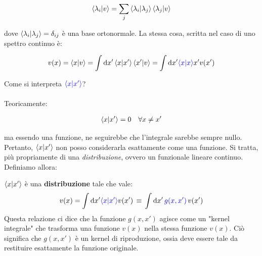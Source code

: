 \begin{align*}
	\braket{\lambda_i}{v} = \sum_j \braket{\lambda_i}{\lambda_j} \braket{\lambda_j}{v}
\end{align*}

	dove $\braket{\lambda_i}{\lambda_j} = \delta_{ij}$ è una base ortonormale. La stessa cosa, scritta nel caso di uno spettro continuo è:
	
\begin{align*}
	v(x) = \braket{x}{v} = \int \dd x' \braket{x}{x'} \braket{x'}{v} = \int \dd x' \textcolor{blue}{\braket{x}}{x'} v(x')
\end{align*}

	Come si interpreta $\textcolor{blue}{\braket{x}{x'}}$?
	\\
	\\
	Teoricamente:
	
\begin{align*}
	\braket{x}{x'} = 0 \quad \forall x \neq x'
\end{align*}

	ma essendo una funzione, ne seguirebbe che l'integrale sarebbe sempre nullo. Pertanto, $\braket{x}{x'}$ non posso considerarla esattamente come una funzione. Si tratta, più propriamente di una \textit{distribuzione}, ovvero un funzionale lineare continuo. Definiamo allora:
	
\begin{mydef}
	$\braket{x}{x'}$ è una \textbf{distribuzione} tale che vale:
\begin{align*}
	v(x) = \int \dd x' \textcolor{blue}{\braket{x}{x'}} v(x') \, \equiv \, \int \dd x' \,\textcolor{blue}{g(x, x')} \, v(x')
\end{align*}
	Questa relazione ci dice che la funzione $g(x, x')$ agisce come un "kernel integrale" che trasforma una funzione $v(x)$ nella stessa funzione $v(x)$. Ciò significa che $g(x, x')$ è un kernel di riproduzione, ossia deve essere tale da restituire esattamente la funzione originale.
\end{mydef}

